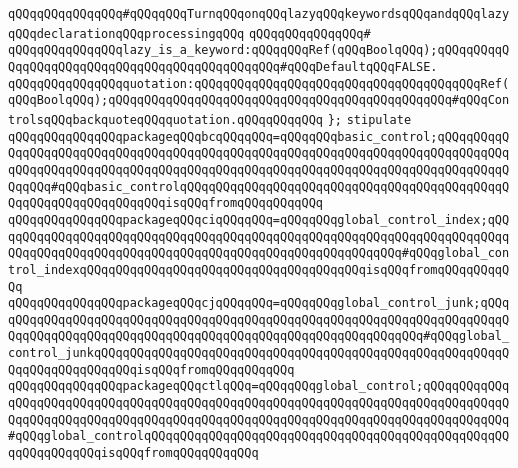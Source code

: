 \verb|qQQqqQQqqQQqqQQq#qQQqqQQqTurnqQQqonqQQqlazyqQQqkeywordsqQQqandqQQqlazyqQQqdeclarationqQQqprocessingqQQq|\newline
\verb|qQQqqQQqqQQqqQQq#|\newline
\verb|qQQqqQQqqQQqqQQqlazy_is_a_keyword:qQQqqQQqRef(qQQqBoolqQQq);qQQqqQQqqQQqqQQqqQQqqQQqqQQqqQQqqQQqqQQqqQQqqQQq#qQQqDefaultqQQqFALSE.|\newline
\verb|qQQqqQQqqQQqqQQqquotation:qQQqqQQqqQQqqQQqqQQqqQQqqQQqqQQqqQQqqQQqRef(qQQqBoolqQQq);qQQqqQQqqQQqqQQqqQQqqQQqqQQqqQQqqQQqqQQqqQQqqQQq#qQQqControlsqQQqbackquoteqQQqquotation.qQQqqQQqqQQq|\newline
\verb|};|\newline
\newline
\newline
\verb|stipulate|\newline
\verb|qQQqqQQqqQQqqQQqpackageqQQqbcqQQqqQQq=qQQqqQQqbasic_control;qQQqqQQqqQQqqQQqqQQqqQQqqQQqqQQqqQQqqQQqqQQqqQQqqQQqqQQqqQQqqQQqqQQqqQQqqQQqqQQqqQQqqQQqqQQqqQQqqQQqqQQqqQQqqQQqqQQqqQQqqQQqqQQqqQQqqQQqqQQqqQQqqQQqqQQqqQQq#qQQqbasic_controlqQQqqQQqqQQqqQQqqQQqqQQqqQQqqQQqqQQqqQQqqQQqqQQqqQQqqQQqqQQqqQQqqQQqisqQQqfromqQQqqQQqqQQq|\newline
\verb|qQQqqQQqqQQqqQQqpackageqQQqciqQQqqQQq=qQQqqQQqglobal_control_index;qQQqqQQqqQQqqQQqqQQqqQQqqQQqqQQqqQQqqQQqqQQqqQQqqQQqqQQqqQQqqQQqqQQqqQQqqQQqqQQqqQQqqQQqqQQqqQQqqQQqqQQqqQQqqQQqqQQqqQQqqQQqqQQq#qQQqglobal_control_indexqQQqqQQqqQQqqQQqqQQqqQQqqQQqqQQqqQQqqQQqisqQQqfromqQQqqQQqqQQq|\newline
\verb|qQQqqQQqqQQqqQQqpackageqQQqcjqQQqqQQq=qQQqqQQqglobal_control_junk;qQQqqQQqqQQqqQQqqQQqqQQqqQQqqQQqqQQqqQQqqQQqqQQqqQQqqQQqqQQqqQQqqQQqqQQqqQQqqQQqqQQqqQQqqQQqqQQqqQQqqQQqqQQqqQQqqQQqqQQqqQQqqQQqqQQq#qQQqglobal_control_junkqQQqqQQqqQQqqQQqqQQqqQQqqQQqqQQqqQQqqQQqqQQqqQQqqQQqqQQqqQQqqQQqqQQqqQQqqQQqisqQQqfromqQQqqQQqqQQq|\newline
\verb|qQQqqQQqqQQqqQQqpackageqQQqctlqQQq=qQQqqQQqglobal_control;qQQqqQQqqQQqqQQqqQQqqQQqqQQqqQQqqQQqqQQqqQQqqQQqqQQqqQQqqQQqqQQqqQQqqQQqqQQqqQQqqQQqqQQqqQQqqQQqqQQqqQQqqQQqqQQqqQQqqQQqqQQqqQQqqQQqqQQqqQQqqQQqqQQqqQQq#qQQqglobal_controlqQQqqQQqqQQqqQQqqQQqqQQqqQQqqQQqqQQqqQQqqQQqqQQqqQQqqQQqqQQqqQQqisqQQqfromqQQqqQQqqQQq|\newline
